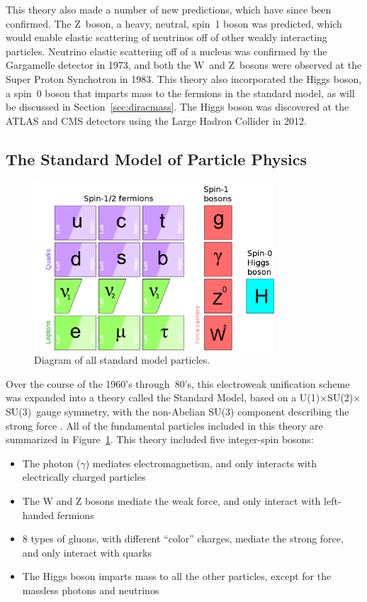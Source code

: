 \documentclass[/main.tex]{subfiles}
\begin{document}
This theory also made a number of new predictions, which have since been confirmed.
The Z~boson, a heavy, neutral, spin~1 boson was predicted, which would enable elastic scattering of neutrinos off of other weakly interacting particles.
Neutrino elastic scattering off of a nucleus was confirmed by the Gargamelle detector in 1973\cite{Gargamelle1973}, and both the W~and Z~bosons were observed at the Super Proton Synchotron in 1983\cite{Arnison1983, Bagnaia1983}.
This theory also incorporated the Higgs boson, a spin~0 boson that imparts mass to the fermions in the standard model, as will be discussed in Section~\ref{sec:diracmass}.
The Higgs boson was discovered at the ATLAS and CMS detectors using the Large Hadron Collider in 2012\cite{ATLAS2012, CMS2012}.

\subsection{The Standard Model of Particle Physics} \label{sec:SM}
\begin{figure}[t]
  \centering
  \includegraphics[width=0.8\textwidth]{SM}
  \caption[Standard Model Particles]{\label{fig:SM}
    Diagram of all standard model particles.
  }
\end{figure}
Over the course of the 1960's through~80's, this electroweak unification scheme was expanded into a theory called the Standard Model, based on a U(1)$\times$SU(2)$\times$SU(3)~gauge symmetry, with the non-Abelian SU(3) component describing the strong force \cite{PDG2018}.
All of the fundamental particles included in this theory are summarized in Figure~\ref{fig:SM}.
This theory included five integer-spin bosons:
\begin{itemize}
\item The photon ($\gamma$) mediates electromagnetism, and only interacts with electrically charged particles
\item The W and Z bosons mediate the weak force, and only interact with left-handed fermions
\item 8 types of gluons, with different ``color'' charges, mediate the strong force, and only interact with quarks
\item The Higgs boson imparts mass to all the other particles, except for the massless photons and neutrinos
\end{itemize}
\end{document}
